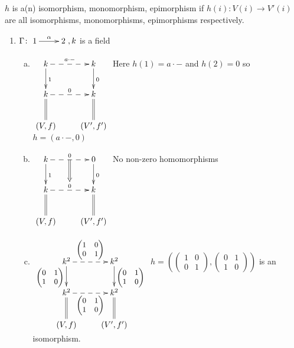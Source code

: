 \begin{note}
\(h\) is a(n) isomorphism, monomorphism, epimorphism if
\(h(i)\colon V(i)\to V'(i)\) are all isomorphisms, monomorphisms,
epimorphisms respectively.
\end{note}

\begin{exam}
\begin{enumerate}[(1)]
\item \(\Gamma\colon \xymatrix{1\ar[r]^{\alpha}& 2}, k\) is a field
    \begin{enumerate}[(a)]
        \item $\xymatrix{k\ar@{-->}[r]^{a\cdot-}\ar[d]^{1} & k\ar[d]^{0} \\
        k\ar@{-->}[r]^{0}\ar@{=}[d] & k\ar@{=}[d]\\
        (V, f) & (V', f')}$
        Here \(h(1) = a\cdot-\) and \(h(2) = 0\) so \(h = (a\cdot-, 0)\)
 \item $\xymatrix{k\ar@{-->}[r]^0="a"\ar[d]^1 & 0\ar[d]^0 \\
        k\ar@{=}[d]\ar@{-->}[r]^0="b" &  k\ar@{=}[d]\ar@{=>} "a";"b"\\
        (V, f) & (V', f') }$ No non-zero homomorphisms
\item
  $\xymatrix{k^2\ar@{-->}[r]^{\small\begin{pmatrix}1&0\\0&1 \end{pmatrix}}\ar[d]_{\small\begin{pmatrix}0&1\\1&0 \end{pmatrix}}
    & k^2\ar[d]^{\small\begin{pmatrix}0&1\\1&0 \end{pmatrix}} \\
   k^2\ar@{=}[d]\ar@{-->}[r]_{\small\begin{pmatrix}0&1\\1&0
       \small\end{pmatrix}} 
   &  k^2\ar@{=}[d]\\
      (V, f) & (V', f') }$
        \(h = \left(\begin{pmatrix}1&0\\0&1\end{pmatrix}, \begin{pmatrix}0&1\\1&0\end{pmatrix}\right)\) is an isomorphism.
    \end{enumerate}

\end{enumerate}
\end{exam}
